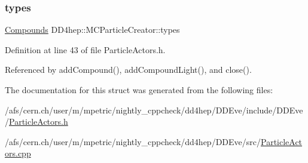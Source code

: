 \subsubsection{\texorpdfstring{types}{types}}
{\footnotesize\ttfamily \hyperlink{struct_d_d4hep_1_1_m_c_particle_creator_a803ff0bb27e3c5cd40daf4d253eb2b62}{Compounds} D\+D4hep\+::\+M\+C\+Particle\+Creator\+::types}



Definition at line 43 of file Particle\+Actors.\+h.



Referenced by add\+Compound(), add\+Compound\+Light(), and close().



The documentation for this struct was generated from the following files\+:\begin{DoxyCompactItemize}
\item 
/afs/cern.\+ch/user/m/mpetric/nightly\+\_\+cppcheck/dd4hep/\+D\+D\+Eve/include/\+D\+D\+Eve/\hyperlink{_particle_actors_8h}{Particle\+Actors.\+h}\item 
/afs/cern.\+ch/user/m/mpetric/nightly\+\_\+cppcheck/dd4hep/\+D\+D\+Eve/src/\hyperlink{_particle_actors_8cpp}{Particle\+Actors.\+cpp}\end{DoxyCompactItemize}
